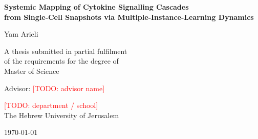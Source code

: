 \documentclass[11pt,a4paper]{article}
\newcommand{\todo}[1]{\textcolor{red}{[TODO: #1]}}
\begin{document}
\begin{titlepage}
\centering
\vspace*{2cm}

{\LARGE\bfseries Systemic Mapping of Cytokine Signalling Cascades\\[0.3em]
from Single-Cell Snapshots via Multiple-Instance-Learning Dynamics\par}

\vspace{2cm}
{\large Yam Arieli\par}

\vspace{2cm}
{\large A thesis submitted in partial fulfilment\\
of the requirements for the degree of\\
Master of Science\par}

\vspace{1.5cm}
{\large Advisor: \todo{advisor name}\par}
\vspace{0.5cm}
{\large \todo{department / school}\\
The Hebrew University of Jerusalem\par}

\vfill
{\large \today\par}
\end{titlepage}


\begin{abstract}
While Immune cells communicate via cytokine signalling cascades that span over time, most of the time we have only single-cell snapshots of the system. In this work, we present a novel approach to infer the dynamics of cytokine signalling cascades from single-cell data using the dynamics of model training to capture the temporal evolution of the system. We demonstrate that our approach can reconstruct the dynamics of cytokine signalling cascades from single-cell snapshots, providing new insights into the temporal evolution of immune cell communication.
\end{abstract}

\newpage
\end{document}
